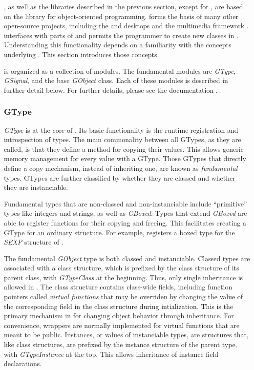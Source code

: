\documentclass[article]{jss}
\begin{document}
, as well as the libraries described in the previous section,
except for , are based on the  library for 
object-oriented programming.  forms the basis of many other 
open-source projects, including the  \citep{GTK} and  
\citep{xfce} desktops and the  multimedia framework \citep{gstreamer}.
 interfaces with parts of  and permits the  
programmer to create new  classes in . Understanding 
this functionality depends on a familiarity with the concepts underlying 
. This section introduces those concepts.

 is organized as a collection of modules. The fundamental
modules are \emph{GType}, \emph{GSignal}, and the base
\emph{GObject} class. Each of these modules is described in further detail below. 
For further details, please see the  documentation \citep{gobject}.

\subsubsection{GType}

\emph{GType} is at the core of . Its basic functionality is the 
runtime registration and introspection of types. The
main commonality between all GTypes, as they are called, is that they define
a method for copying their values. This allows generic memory management for
every value with a GType. Those GTypes that directly define a copy mechanism,
instead of inheriting one, are known as \emph{fundamental} types.
GTypes are further classified by whether they are classed and whether they are
instanciable. 

Fundamental types that are non-classed and non-instanciable 
include ``primitive'' types like integers and strings, as well as \emph{GBoxed}.
Types that extend \emph{GBoxed} are able to register functions for their
copying and freeing. This facilitates creating a GType for an ordinary 
 structure. For example,  registers a boxed type for 
the \emph{SEXP} structure of . 

The fundamental \emph{GObject} type is both classed and instanciable. Classed 
types are associated with a class structure, which is prefixed by the class structure 
of its parent class, with \emph{GTypeClass} at the beginning. Thus, only single
inheritance is allowed in .
The class structure contains class-wide fields, including function pointers
called \emph{virtual functions} that may be overriden by changing
the value of the corresponding field in the class structure during intialization.
This is the primary mechanism in  for changing object behavior through
inheritance. For convenience, wrappers are normally implemented for virtual
functions that are meant to be public. Instances, or values of instanciable types, 
are structures that, like class structures, are prefixed by the instance structure
of the parent type, with \emph{GTypeInstance} at the top. 
This allows inheritance of instance field declarations. 
\end{document}

